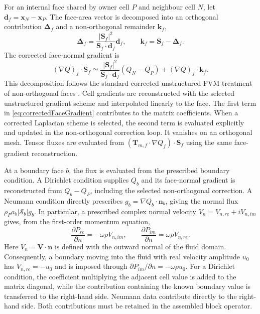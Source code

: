\documentclass[final,12pt,nopreprintline,longtitle]{elsarticle}
\newcommand{\V}{\mathbf{V}}
\newcommand{\x}{\mathbf{x}}
\newcommand{\Sf}{\mathbf{S}_f}
\begin{document}
For an internal face shared by owner cell $P$ and neighbour cell $N$, let
$\mathbf{d}_f=\x_N-\x_P$.  The face-area vector is decomposed into an
orthogonal contribution $\boldsymbol{\Delta}_f$ and a non-orthogonal remainder
$\mathbf{k}_f$,
\begin{equation}
    \boldsymbol{\Delta}_f
    =\frac{|\Sf|^2}{\Sf\cdot\mathbf{d}_f}\mathbf{d}_f,
    \qquad
    \mathbf{k}_f=\Sf-\boldsymbol{\Delta}_f.
    \label{eq:faceAreaDecomposition}
\end{equation}
The corrected face-normal gradient is
\begin{equation}
    (\nabla Q)_f\cdot\Sf
    \simeq
    \frac{|\Sf|^2}{\Sf\cdot\mathbf{d}_f}(Q_N-Q_P)
    +(\nabla Q)_f\cdot\mathbf{k}_f.
    \label{eq:correctedFaceGradient}
\end{equation}
This decomposition follows the standard corrected unstructured FVM treatment
of non-orthogonal faces \cite{Jasak1996,Moukalled2016}.
Cell gradients are reconstructed with the selected unstructured gradient
scheme and interpolated linearly to the face.  The first term in
\cref{eq:correctedFaceGradient} contributes to the matrix coefficients.  When
a corrected Laplacian scheme is selected, the second term is evaluated
explicitly and updated in the non-orthogonal correction loop.  It vanishes on
an orthogonal mesh.  Tensor fluxes are evaluated from
$(\mathbf{T}_{m,f}\cdot\nabla Q_f)\cdot\Sf$ using the same face-gradient
reconstruction.

At a boundary face $b$, the flux is evaluated from the prescribed boundary
condition.  A Dirichlet condition supplies $Q_b$ and its face-normal gradient
is reconstructed from $Q_b-Q_P$, including the selected non-orthogonal
correction.  A Neumann condition directly prescribes
$g_b=\nabla Q_b\cdot\mathbf{n}_b$, giving the normal flux
$\rho_Pa_b|\mathcal{S}_b|g_b$.  In particular, a prescribed complex normal
velocity $V_n=V_{n,re}+iV_{n,im}$ gives, from the first-order momentum equation,
\begin{equation}
    \frac{\partial P_{re}}{\partial n}
    =-\omega\rho V_{n,im},
    \qquad
    \frac{\partial P_{im}}{\partial n}
    =\omega\rho V_{n,re}.
    \label{eq:velocityPressureBoundary}
\end{equation}
Here $V_n=\V\cdot\mathbf{n}$ is defined with the outward normal of the fluid
domain.  Consequently, a boundary moving into the fluid with real velocity
amplitude $u_0$ has $V_{n,re}=-u_0$ and is imposed through
$\partial P_{im}/\partial n=-\omega\rho u_0$.
For a Dirichlet condition, the coefficient multiplying the adjacent cell value
is added to the matrix diagonal, while the contribution containing the known
boundary value is transferred to the right-hand side.  Neumann data contribute
directly to the right-hand side.
Both contributions must be retained in the assembled block operator.
\end{document}
